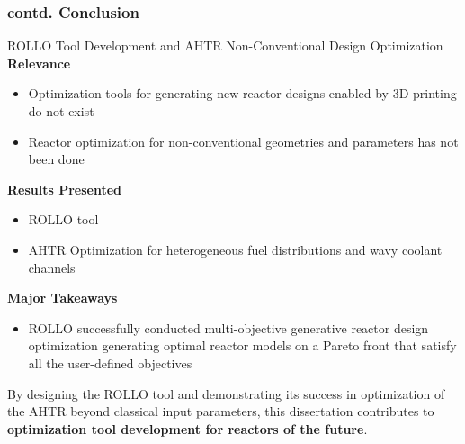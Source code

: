 \begin{frame}
    \frametitle{contd. Conclusion}
    \begin{block}{ROLLO Tool Development and AHTR Non-Conventional Design Optimization}
        \small
        \textbf{Relevance}
        \begin{itemize}
            \item Optimization tools for generating new reactor designs enabled by
            3D printing do not exist
            \item Reactor optimization for non-conventional geometries and parameters 
            has not been done 
        \end{itemize}
        \textbf{Results Presented}
        \begin{itemize}
            \item \acrfull{ROLLO} tool 
            \item AHTR Optimization for heterogeneous fuel distributions and wavy 
            coolant channels 
        \end{itemize}
        \textbf{Major Takeaways} 
        \begin{itemize}
            \item ROLLO successfully conducted multi-objective generative reactor 
            design optimization generating optimal reactor models on a Pareto front 
            that satisfy all the user-defined objectives
        \end{itemize}
    \end{block}
    \vspace{-0.1cm}
    By designing the ROLLO tool and demonstrating its success in 
    optimization of the \gls{AHTR} beyond classical input parameters, this dissertation 
    contributes to \textbf{optimization tool development for reactors of the future}. 
\end{frame}

